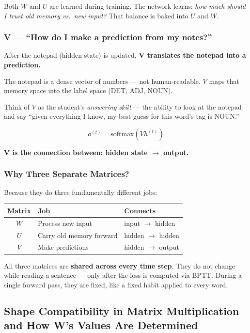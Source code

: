 Both $W$ and $U$ are learned during training. The network learns: \textit{how much should I trust old memory vs.\ new input?} That balance is baked into $U$ and $W$.

\subsubsection{V — ``How do I make a prediction from my notes?''}

After the notepad (hidden state) is updated, \textbf{V translates the notepad into a prediction.}

The notepad is a dense vector of numbers --- not human-readable. $V$ maps that memory space into the label space (DET, ADJ, NOUN).

Think of $V$ as the student's \textit{answering skill} --- the ability to look at the notepad and say ``given everything I know, my best guess for this word's tag is NOUN.''

\[
o^{(t)} = \text{softmax}\!\left(V h^{(t)}\right)
\]

\textbf{V is the connection between: hidden state $\rightarrow$ output.}

\subsubsection{Why Three Separate Matrices?}

Because they do three fundamentally different jobs:

\begin{center}
\begin{tabular}{|c|l|l|}
\hline
\textbf{Matrix} & \textbf{Job} & \textbf{Connects} \\
\hline
$W$ & Process new input & input $\rightarrow$ hidden \\
$U$ & Carry old memory forward & hidden $\rightarrow$ hidden \\
$V$ & Make predictions & hidden $\rightarrow$ output \\
\hline
\end{tabular}
\end{center}

All three matrices are \textbf{shared across every time step}. They do not change while reading a sentence --- only after the loss is computed via BPTT. During a single forward pass, they are fixed, like a fixed habit applied to every word.


\subsection{Shape Compatibility in Matrix Multiplication and How W's Values Are Determined}

